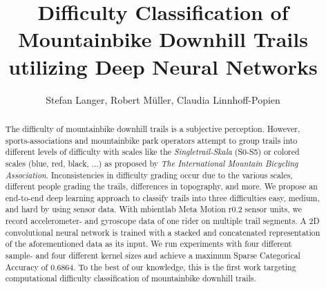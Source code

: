 \documentclass[runningheads]{llncs}
\begin{document}
\title{Difficulty Classification of Mountainbike Downhill Trails utilizing Deep Neural Networks}

\author{Stefan Langer, Robert M\"uller, Claudia Linnhoff-Popien}

\maketitle

\begin{abstract}
The difficulty of mountainbike downhill trails is a subjective perception. 
However, sports-associations and mountainbike park operators attempt to group trails into different levels of difficulty with scales like the \textit{Singletrail-Skala} (S0-S5) or  colored scales (blue, red, black, ...) as proposed by \textit{The International Mountain Bicycling Association}.
Inconsistencies in difficulty grading occur due to the various scales, different people grading the trails, differences in topography, and more.
We propose an end-to-end deep learning approach to classify trails into three difficulties easy, medium, and hard by using sensor data.
With mbientlab Meta Motion r0.2 sensor units, we record accelerometer- and gyroscope data of one rider on multiple trail segments.
A 2D convolutional neural network is trained with a stacked and concatenated representation of the aforementioned data as its input.
We run experiments with four different sample- and four different kernel sizes and achieve a maximum Sparse Categorical Accuracy of 0.6864.
To the best of our knowledge, this is the first work targeting computational difficulty classification of mountainbike downhill trails.


\end{abstract}
%
%
%
\end{document}
